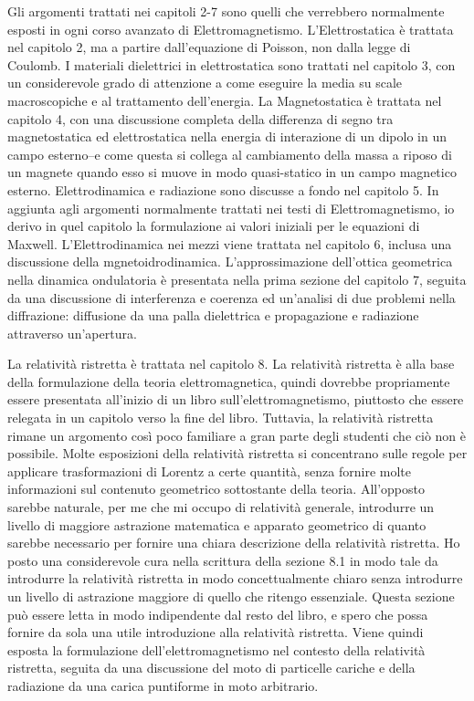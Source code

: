 Gli argomenti trattati nei capitoli 2-7 sono quelli che verrebbero normalmente esposti in ogni corso avanzato di Elettromagnetismo. L'Elettrostatica è trattata nel capitolo 2, ma a partire dall'equazione di Poisson, non dalla legge di Coulomb. I materiali dielettrici in elettrostatica sono trattati nel capitolo 3, con un considerevole grado di attenzione a come eseguire la media su scale macroscopiche e al trattamento dell'energia. La Magnetostatica è trattata nel capitolo 4, con una discussione completa della differenza di segno tra magnetostatica ed elettrostatica nella energia di interazione di un dipolo in un campo esterno--e come questa si collega al cambiamento della massa a riposo di un magnete quando esso si muove in modo quasi-statico in un campo magnetico esterno. Elettrodinamica e radiazione sono discusse a fondo nel capitolo 5. In aggiunta agli argomenti normalmente trattati nei testi di Elettromagnetismo, io derivo in quel capitolo la formulazione ai valori iniziali per le equazioni di Maxwell. L'Elettrodinamica nei mezzi viene trattata nel capitolo 6, inclusa una discussione della mgnetoidrodinamica. L'approssimazione dell'ottica geometrica nella dinamica ondulatoria è presentata nella prima sezione del capitolo 7, seguita da una discussione di interferenza e coerenza ed un'analisi di due problemi nella diffrazione: diffusione da una palla dielettrica e propagazione e radiazione attraverso un'apertura.

La relatività ristretta è trattata nel capitolo 8. La relatività ristretta è alla base della formulazione della teoria elettromagnetica, quindi dovrebbe propriamente essere presentata all'inizio di un libro sull'elettromagnetismo, piuttosto che essere relegata in un capitolo verso la fine del libro. Tuttavia, la relatività ristretta rimane un argomento così poco familiare a gran parte degli studenti che ciò non è possibile. Molte esposizioni della relatività ristretta si concentrano sulle regole per applicare trasformazioni di Lorentz a certe quantità, senza fornire molte informazioni sul contenuto geometrico sottostante della teoria. All'opposto sarebbe naturale, per me che mi occupo di relatività generale, introdurre un livello di maggiore astrazione matematica e apparato geometrico di quanto sarebbe necessario per fornire una chiara descrizione della relatività ristretta. Ho posto una considerevole cura nella scrittura della sezione 8.1 in modo tale da introdurre la relatività ristretta in modo concettualmente chiaro senza introdurre un livello di astrazione maggiore di quello che ritengo essenziale. Questa sezione può essere letta in modo indipendente dal resto del libro, e spero che possa fornire da sola una utile introduzione alla relatività ristretta. 
Viene quindi esposta la formulazione dell'elettromagnetismo nel contesto della relatività ristretta, seguita da una discussione del moto di particelle cariche e della radiazione da una carica puntiforme in moto arbitrario.

